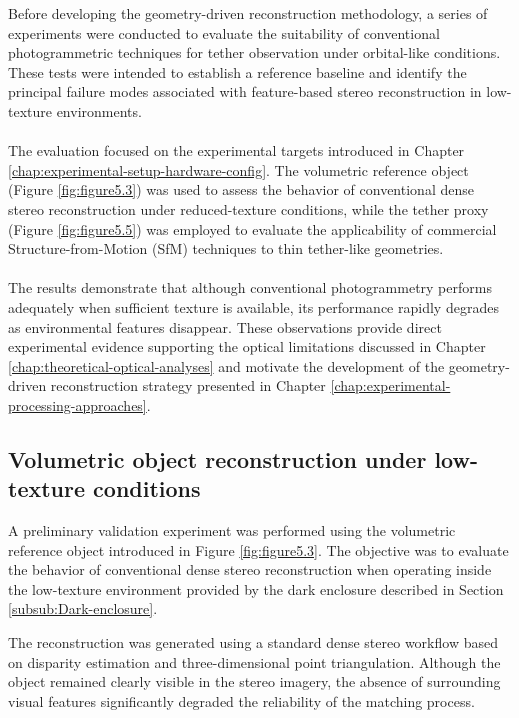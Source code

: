 Before developing the geometry-driven reconstruction methodology, a series of experiments were conducted to evaluate the suitability of conventional photogrammetric techniques for tether observation under orbital-like conditions. These tests were intended to establish a reference baseline and identify the principal failure modes associated with feature-based stereo reconstruction in low-texture environments.
\\\\
The evaluation focused on the experimental targets introduced in Chapter \ref{chap:experimental-setup-hardware-config}. The volumetric reference object (Figure \ref{fig:figure5.3}) was used to assess the behavior of conventional dense stereo reconstruction under reduced-texture conditions, while the tether proxy (Figure \ref{fig:figure5.5}) was employed to evaluate the applicability of commercial Structure-from-Motion (SfM) techniques to thin tether-like geometries.
\\\\
The results demonstrate that although conventional photogrammetry performs adequately when sufficient texture is available, its performance rapidly degrades as environmental features disappear. These observations provide direct experimental evidence supporting the optical limitations discussed in Chapter \ref{chap:theoretical-optical-analyses} and motivate the development of the geometry-driven reconstruction strategy presented in Chapter \ref{chap:experimental-processing-approaches}.

\subsection{Volumetric object reconstruction under low-texture conditions}
\label{sub:volumetric-object-reconstruction}

A preliminary validation experiment was performed using the volumetric reference object introduced in Figure \ref{fig:figure5.3}. The objective was to evaluate the behavior of conventional dense stereo reconstruction when operating inside the low-texture environment provided by the dark enclosure described in Section \ref{subsub:Dark-enclosure}.

The reconstruction was generated using a standard dense stereo workflow based on disparity estimation and three-dimensional point triangulation. Although the object remained clearly visible in the stereo imagery, the absence of surrounding visual features significantly degraded the reliability of the matching process.

